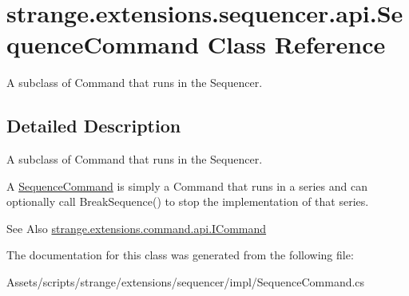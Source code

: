 \hypertarget{classstrange_1_1extensions_1_1sequencer_1_1api_1_1_sequence_command}{\section{strange.\-extensions.\-sequencer.\-api.\-Sequence\-Command Class Reference}
\label{classstrange_1_1extensions_1_1sequencer_1_1api_1_1_sequence_command}
}


A subclass of Command that runs in the Sequencer.  




\subsection{Detailed Description}
A subclass of Command that runs in the Sequencer. 

A \hyperlink{classstrange_1_1extensions_1_1sequencer_1_1api_1_1_sequence_command}{Sequence\-Command} is simply a Command that runs in a series and can optionally call {\ttfamily Break\-Sequence()} to stop the implementation of that series.

\begin{DoxySeeAlso}{See Also}
\hyperlink{interfacestrange_1_1extensions_1_1command_1_1api_1_1_i_command}{strange.\-extensions.\-command.\-api.\-I\-Command} 
\end{DoxySeeAlso}


The documentation for this class was generated from the following file\-:\begin{DoxyCompactItemize}
\item 
Assets/scripts/strange/extensions/sequencer/impl/Sequence\-Command.\-cs\end{DoxyCompactItemize}

